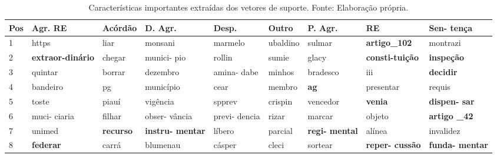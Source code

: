 \begin{table}[h]
  \centering
  \caption[Características importantes extraídas dos vetores de suporte]{Características importantes extraídas dos vetores de suporte. Fonte: Elaboração própria.}
  \label{tab:caracteristicasImportantes}
  \begin{tabular}{|p{1cm}|m{1.5cm}|m{1.5cm}|m{1.5cm}|m{1.5cm}|m{1.5cm}|m{1.5cm}|m{1.5cm}|m{1.5cm}|}
  	\hline
	\textbf{Pos} & \textbf{Agr. RE} & \textbf{Acórdão} & \textbf{D. Agr.} & \textbf{Desp.} & \textbf{Outro} & \textbf{P. Agr.} & \textbf{RE} & \textbf{Sen- \newline tença} \\ \hline
	1 &  https & liar & monsani & marmelo & ubaldino & sulmar & \textbf{artigo\newline\_102} & montrazi \\ \hline
	2 &  \textbf{extraor-\newline dinário} & chegar & munici- \newline pio & rollin & sumie & glacy & \textbf{consti-\newline tuição} & \textbf{inspeção} \\ \hline
    3 &  quintar & borrar & dezembro & amina- \newline dabe & minhos & bradesco & iii & \textbf{decidir} \\ \hline
    4 &  bandeiro & pg & município & cear & membro & \textbf{ag} & presentar & requis \\ \hline
    5 &  toste & piauí & vigência & spprev & crispin & vencedor & \textbf{venia} & \textbf{dispen- \newline sar} \\ \hline
    6 &  muci- \newline ciaria & filhar & obser- \newline vância & previ- \newline dencia & rizar & marcar & objeto & \textbf{artigo \newline \_42} \\ \hline
    7 &  unimed & \textbf{recurso} & \textbf{instru- \newline mentar} & líbero & parcial & \textbf{regi- \newline mental} & alínea & invalidez \\ \hline
    8 &  \textbf{federar} & carrá & blumenau & cásper & cleci & sortear & \textbf{reper- \newline cussão} & \textbf{funda- \newline mentar} \\ \hline

\end{tabular}
\end{table}
